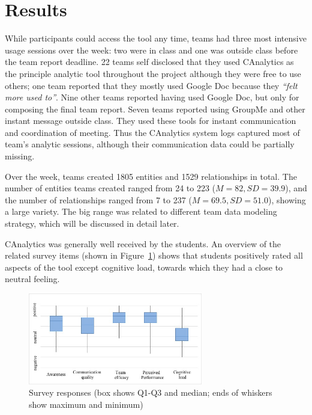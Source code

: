 \section{Results}\label{results}

While participants could access the tool any time, teams had three most
intensive usage sessions over the week: two were in class and one was outside
class before the team report deadline. 22 teams self disclosed that they used
CAnalytics as the principle analytic tool throughout the project although they
were free to use others; one team reported that they mostly used Google Doc
because they \emph{``felt more used to''}. Nine other teams reported having used
Google Doc, but only for composing the final team report. Seven teams reported
using GroupMe and other instant message outside class. They used these tools for
instant communication and coordination of meeting. Thus the CAnalytics system logs captured
most of team's analytic sessions, although their communication data could be
partially missing.

Over the week, teams created 1805 entities and 1529 relationships in
total. The number of entities teams created ranged from 24 to 223 ($M=82,
SD=39.9$), and the number of relationships ranged from 7 to 237 ($M=69.5,
SD=51.0$), showing a large variety. The big range was related to different team data modeling strategy,
which will be discussed in detail later.

CAnalytics was generally well received by the students. An overview of
the related survey items (shown in Figure~\ref{fig:survey}) shows that students positively rated all aspects
of the tool except cognitive load, towards which they had a close to neutral feeling. %

\begin{figure}
\centering
\includegraphics[width=3.00000in]{./img/survey_boxchart.jpg}
\caption{Survey responses (box shows Q1-Q3 and median; ends of whiskers show
maximum and minimum)\label{fig:survey}}
\end{figure}

